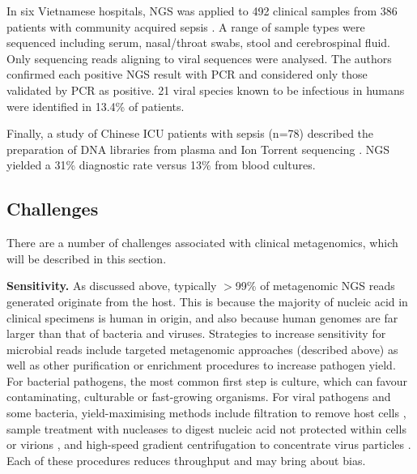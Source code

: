 In six Vietnamese hospitals, NGS was applied to 492 clinical samples from 386 patients with community acquired sepsis \parencite{Anh2019}. A range of sample types were sequenced including serum, nasal/throat swabs, stool and cerebrospinal fluid. Only sequencing reads aligning to viral sequences were analysed. The authors confirmed each positive NGS result with PCR and considered only those validated by PCR as positive. 21 viral species known to be infectious in humans were identified in 13.4\% of patients.

Finally, a study of Chinese ICU patients with sepsis (n=78) described the preparation of DNA libraries from plasma and Ion Torrent sequencing \parencite{Long2016}. NGS yielded a 31\% diagnostic rate versus 13\% from blood cultures. 

\subsection{Challenges}
There are a number of challenges associated with clinical metagenomics, which will be described in this section.

\textbf{Sensitivity.} As discussed above, typically $>$99\% of metagenomic NGS reads generated originate from the host. This is because the majority of nucleic acid in clinical specimens is human in origin, and also because human genomes are far larger than that of bacteria and viruses. Strategies to increase sensitivity for microbial reads include targeted metagenomic approaches (described above) as well as other purification or enrichment procedures to increase pathogen yield. For bacterial pathogens, the most common first step is culture, which can favour contaminating, culturable or fast-growing organisms. For viral pathogens and some bacteria, yield-maximising methods include filtration to remove host cells \parencite{Allander2001}, sample treatment with nucleases to digest nucleic acid not protected within cells or virions \parencite{Allander2001} \parencite{Charalampous2019}, and high-speed gradient centrifugation to concentrate virus particles \parencite{Breitbart2005}. Each of these procedures reduces throughput and may bring about bias.

